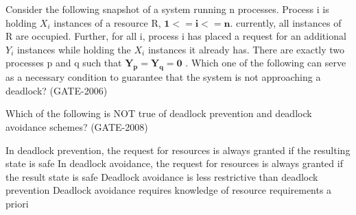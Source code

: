 \begin{questyle}

  \question  Consider the following snapshot of a system running n processes. Process i is holding \(X_i\) instances of a resource R, \( \mathbf{ 1 <= i <= n } \). currently, all instances of R are occupied. Further, for all i, process i has placed a request for an additional \(Y_i\) instances while holding the \(X_i\) instances it already has. There are exactly two processes p and q such that \( \mathbf{ Y_p = Y_q = 0 } \) . Which one of the following can serve as a necessary condition to guarantee that the system is not approaching a deadlock? (GATE-2006)

  \begin{choices}
  \end{choices}

  \end{questyle}




\begin{questyle}

  \question  Which of the following is NOT true of deadlock prevention and deadlock avoidance schemes? (GATE-2008)

  \begin{choices}
    \choice  In deadlock prevention, the request for resources is always granted if the resulting state is safe
    \choice  In deadlock avoidance, the request for resources is always granted if the result state is safe
    \choice  Deadlock avoidance is less restrictive than deadlock prevention
    \choice  Deadlock avoidance requires knowledge of resource requirements a priori
  \end{choices}

  \end{questyle}





